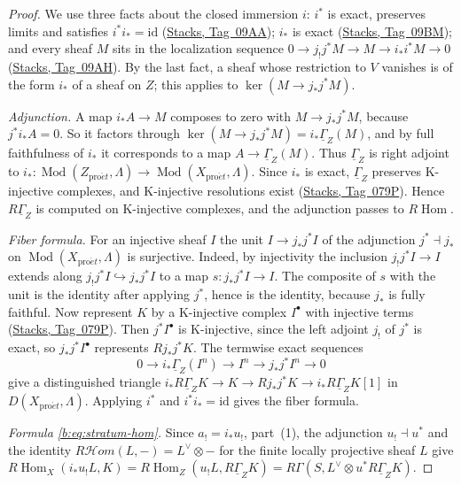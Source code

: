 \documentclass[11pt,a4paper]{article}
\numberwithin{equation}{section}
\theoremstyle{definition}
\theoremstyle{remark}
\newcommand{\D}{D}
\newcommand{\RHom}{R\!\operatorname{Hom}}
\newcommand{\cHom}{R\mathcal{H}\!om}
\newcommand{\Mod}{\operatorname{Mod}}
\newcommand{\proet}{\mathrm{pro}\acute{e}t}
\newcommand{\stacks}[1]{\href{https://stacks.math.columbia.edu/tag/#1}{\textnormal{Stacks, Tag~#1}}}
\begin{document}
\begin{proof}
We use three facts about the closed immersion $i$: $i^*$ is exact,
preserves limits and satisfies $i^*i_*=\mathrm{id}$ (\stacks{09AA});
$i_*$ is exact (\stacks{09BM}); and every sheaf $M$ sits in the
localization sequence $0\to j_!j^*M\to M\to i_*i^*M\to0$ (\stacks{09AH}).
By the last fact, a sheaf whose restriction to $V$ vanishes is of the form
$i_*$ of a sheaf on $Z$; this applies to $\ker(M\to j_*j^*M)$.

\emph{Adjunction.} A map $i_*A\to M$ composes to zero with
$M\to j_*j^*M$, because $j^*i_*A=0$. So it factors through
$\ker(M\to j_*j^*M)=i_*\underline\Gamma_Z(M)$, and by full faithfulness of
$i_*$ it corresponds to a map $A\to\underline\Gamma_Z(M)$. Thus
$\underline\Gamma_Z$ is right adjoint to
$i_*\colon\Mod(Z_{\proet},\Lambda)\to\Mod(X_{\proet},\Lambda)$. Since $i_*$ is
exact, $\underline\Gamma_Z$ preserves K-injective complexes, and K-injective
resolutions exist (\stacks{079P}). Hence $R\underline\Gamma_Z$ is computed
on K-injective complexes, and the adjunction passes to $\RHom$.

\emph{Fiber formula.} For an injective sheaf $I$ the unit
$I\to j_*j^*I$ of the adjunction $j^*\dashv j_*$ on
$\Mod(X_{\proet},\Lambda)$ is surjective. Indeed, by injectivity the inclusion
$j_!j^*I\to I$ extends along $j_!j^*I\hookrightarrow j_*j^*I$ to a map
$s:j_*j^*I\to I$. The composite of $s$ with the unit is the identity
after applying $j^*$, hence is the identity, because $j_*$ is fully
faithful. Now represent $K$ by a K-injective complex $I^\bullet$ with
injective terms (\stacks{079P}). Then $j^*I^\bullet$ is K-injective,
since the left adjoint $j_!$ of $j^*$ is exact, so $j_*j^*I^\bullet$
represents $Rj_*j^*K$. The termwise exact sequences
\[
 0\to i_*\underline\Gamma_Z(I^n)\to I^n\to j_*j^*I^n\to0
\]
give a distinguished triangle
$i_*R\underline\Gamma_ZK\to K\to Rj_*j^*K\to i_*R\underline\Gamma_ZK[1]$
in $\D(X_{\proet},\Lambda)$.
Applying $i^*$ and $i^*i_*=\mathrm{id}$ gives the fiber formula.

\emph{Formula \eqref{b:eq:stratum-hom}.} Since $a_!=i_*u_!$, part~(1),
the adjunction $u_!\dashv u^*$ and the identity
$\cHom(L,-)=L^\vee\otimes-$ for the finite locally projective sheaf $L$ give
$\RHom_X(i_*u_!L,K)=\RHom_Z(u_!L,R\underline\Gamma_ZK)
=R\Gamma(S,L^\vee\otimes u^*R\underline\Gamma_ZK)$.
\end{proof}
\end{document}

